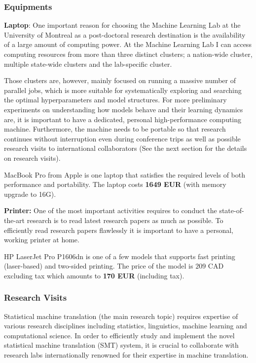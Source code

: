 \documentclass[11pt, oneside]{essay}
\begin{document}
\subsubsection{Equipments}


\textbf{Laptop}: 
One important reason for choosing the Machine Learning Lab at the
University of Montreal as a post-doctoral research destination is
the availability of a large amount of computing power. At
the Machine Learning Lab I can access computing resources from
more than three distinct clusters; a nation-wide cluster,
multiple state-wide clusters and the lab-specific cluster.

Those clusters are, however, mainly focused on running a massive
number of parallel jobs, which is more suitable for
systematically exploring and searching the optimal
hyperparameters and model structures. For more preliminary
experiments on understanding how models behave and their learning
dynamics are, it is important to have a dedicated, personal
high-performance computing machine.  Furthermore, the machine
needs to be portable so that research continues without
interruption even during conference trips as well as possible
research visits to international collaborators (See the next
section for the details on research visits).

MacBook Pro from Apple is one laptop that satisfies the required
levels of both performance and portability. The laptop costs
\textbf{1649 EUR} (with memory upgrade to 16G).

\textbf{Printer:}
One of the most important activities requires to conduct the
state-of-the-art research is to read latest research papers as
much as possible. To efficiently read research papers flawlessly
it is important to have a personal, working printer at home. 

HP LaserJet Pro P1606dn is one of a few models that supports fast
printing (laser-based) and two-sided printing. The price of the
model is $209$ CAD excluding tax which amounts to \textbf{170
EUR} (including tax).



\subsubsection{Research Visits}

Statistical machine translation (the main research topic)
requires expertise of various research disciplines including
statistics, linguistics, machine learning and computational
science. In order to efficiently study and implement the novel
statistical machine translation (SMT) system, it is crucial to
collaborate with research labs internationally renowned for their
expertise in machine translation.
\end{document}
